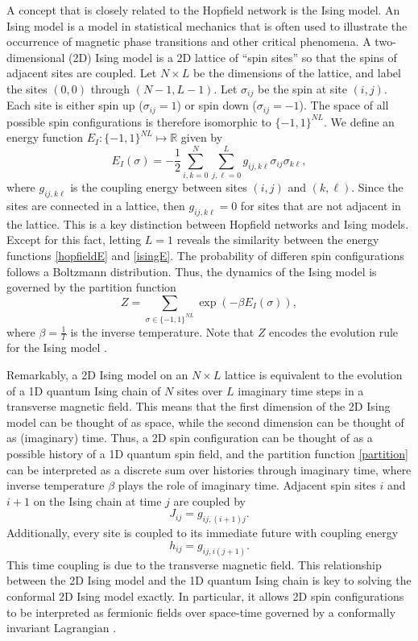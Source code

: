 \documentclass[12pt]{article}
\begin{document}
A concept that is closely related to the Hopfield network is the Ising model. An Ising model is a model in statistical mechanics that is often used to illustrate the occurrence of magnetic phase transitions and other critical phenomena. A two-dimensional (2D) Ising model is a 2D lattice of ``spin sites'' so that the spins of adjacent sites are coupled. Let $N\times L$ be the dimensions of the lattice, and label the sites $(0,0)$ through $(N-1,L-1)$. Let $\sigma_{ij}$ be the spin at site $(i,j)$. Each site is either spin up ($\sigma_{ij}=1$) or spin down ($\sigma_{ij}=-1$). The space of all possible spin configurations is therefore isomorphic to $\{-1,1\}^{NL}$. We define an energy function $E_I:\{-1,1\}^{NL}\mapsto \mathbb{R}$ given by
\begin{equation} \label{isingE}
E_I(\sigma) = -\frac{1}{2}\sum_{i,k=0}^N\sum_{j,\ell=0}^L g_{ij,k\ell}\sigma_{ij}\sigma_{k\ell},
\end{equation}
where $g_{ij,k\ell}$ is the coupling energy between sites $(i,j)$ and $(k,\ell)$. Since the sites are connected in a lattice, then $g_{ij,k\ell}=0$ for sites that are not adjacent in the lattice. This is a key distinction between Hopfield networks and Ising models. Except for this fact, letting $L=1$ reveals the similarity between the energy functions \eqref{hopfieldE} and \eqref{isingE}. The probability of differen spin configurations follows a Boltzmann distribution. Thus, the dynamics of the Ising model is governed by the partition function
\begin{equation} \label{partition}
Z = \sum_{\sigma\in\{-1,1\}^{NL}} \exp(-\beta E_I(\sigma)),
\end{equation}
where $\beta = \frac{1}{T}$ is the inverse temperature. Note that $Z$ encodes the evolution rule for the Ising model \cite{molignini}.

Remarkably, a 2D Ising model on an $N\times L$ lattice is equivalent to the evolution of a 1D quantum Ising chain of $N$ sites over $L$ imaginary time steps in a transverse magnetic field. This means that the first dimension of the 2D Ising model can be thought of as space, while the second dimension can be thought of as (imaginary) time. Thus, a 2D spin configuration can be thought of as a possible history of a 1D quantum spin field, and the partition function \eqref{partition} can be interpreted as a discrete sum over histories through imaginary time, where inverse temperature $\beta$ plays the role of imaginary time. Adjacent spin sites $i$ and $i+1$ on the Ising chain at time $j$ are coupled by
\[ J_{ij} = g_{ij,(i+1)j}. \]
Additionally, every site is coupled to its immediate future with coupling energy
\[ h_{ij} = g_{ij,i(j+1)}. \]
This time coupling is due to the transverse magnetic field. This relationship between the 2D Ising model and the 1D quantum Ising chain is key to solving the conformal 2D Ising model exactly. In particular, it allows 2D spin configurations to be interpreted as fermionic fields over space-time governed by a conformally invariant Lagrangian \cite{molignini}.
\end{document}

